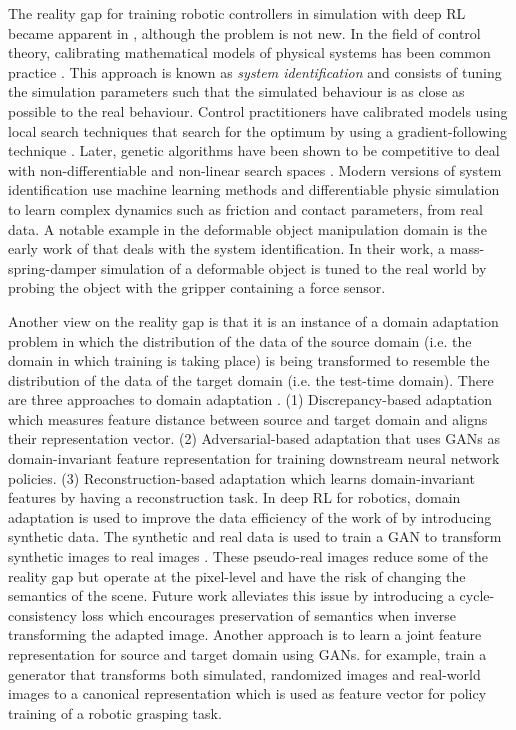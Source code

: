 \documentclass[\home/main.tex]{subfiles}
\begin{document}
The reality gap for training robotic controllers in simulation with deep RL became apparent in \autocite{Zhang2015}, although the problem is not new. In the field of control theory, calibrating mathematical models of physical systems has been common practice \autocite{ljung1983theory}. This approach is known as \emph{system identification} and consists of tuning the simulation parameters such that the simulated behaviour is as close as possible to the real behaviour. Control practitioners have calibrated models using local search techniques that search for the optimum by using a gradient-following technique \autocite{ljung1983theory}. Later, genetic algorithms have been shown to be competitive to deal with non-differentiable and non-linear search spaces \autocite{Kristinsson1992}. Modern versions of system identification use machine learning methods \autocite{chebotar2019closing} and differentiable physic simulation \autocite{heiden2021neuralsim} to learn complex dynamics such as friction and contact parameters, from real data. A notable example in the deformable object manipulation domain is the early work of \textcite{Howard2000} that deals with the system identification. In their work, a mass-spring-damper simulation of a deformable object is tuned to the real world by probing the object with the gripper containing a force sensor.

Another view on the reality gap is that it is an instance of a domain adaptation problem in which the distribution of the data of the source domain (i.e. the domain in which training is taking place) is being transformed to resemble the distribution of the data of the target domain (i.e. the test-time domain). There are three approaches to domain adaptation \autocite{Zhao2020}. (1) Discrepancy-based adaptation which measures feature distance between source and target domain and aligns their representation vector. (2) Adversarial-based adaptation that uses \glspl{GAN} as domain-invariant feature representation for training downstream neural network policies. (3) Reconstruction-based adaptation which learns domain-invariant features by having a reconstruction task.
In deep RL for robotics, domain adaptation is used to improve the data efficiency of the work of \autocite{Levine2016} by introducing synthetic data. The synthetic and real data is used to train a \gls{GAN} to transform synthetic images to real images \autocite{bousmalis2018using}. These pseudo-real images reduce some of the reality gap but operate at the pixel-level and have the risk of changing the semantics of the scene. Future work \autocite{rao2020rl} alleviates this issue by introducing a cycle-consistency loss which encourages preservation of semantics when inverse transforming the adapted image. Another approach is to learn a joint feature representation for source and target domain using \glspl{GAN}.\Textcite{james2019sim} for example, train a generator that transforms both simulated, randomized images and real-world images to a canonical representation which is used as feature vector for policy training of a robotic grasping task. 
\end{document}
